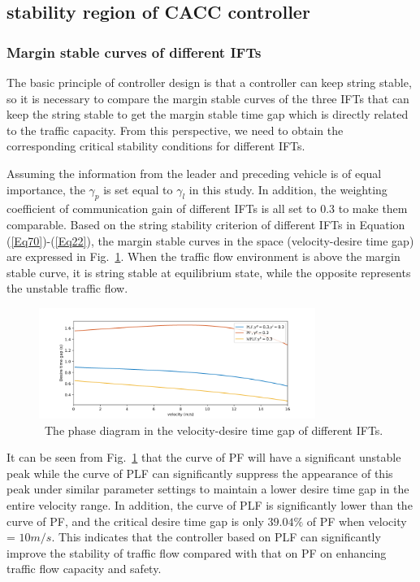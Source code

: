 \documentclass[journal]{IEEEtran}
\begin{document}
\subsection{stability region of CACC controller}
\subsubsection{Margin stable curves of different IFTs}
\label{Section 5.1.1}
The basic principle of controller design is that a controller can keep string stable, so it is necessary to compare the margin stable curves of the three IFTs that can keep the string stable to get the margin stable time gap which is directly related to the traffic capacity. From this perspective, we need to obtain the corresponding critical stability conditions for different IFTs.


Assuming the information from the leader and preceding vehicle is of equal importance, the $\gamma_p$ is set equal to $\gamma_l$ in this study. In addition, the weighting coefficient of communication gain of different IFTs is all set to 0.3 to make them comparable. Based on the string stability criterion of different IFTs in Equation (\ref{Eq70})-(\ref{Eq22}), the margin stable curves in the space (velocity-desire time gap) are expressed in Fig.~\ref{Figure3}. When the traffic flow environment is above the margin stable curve, it is string stable at equilibrium state, while the opposite represents the unstable traffic flow.

\begin{figure}
\centering
\includegraphics[width=9cm]{fig3.png}
\caption{~The phase diagram in the velocity-desire time gap of different IFTs.} 
\label{Figure3}
\end{figure}

It can be seen from Fig.~\ref{Figure3} that the curve of PF will have a significant unstable peak while the curve of PLF can significantly suppress the appearance of this peak under similar parameter settings to maintain a lower desire time gap in the entire velocity range. In addition, the curve of PLF is significantly lower than the curve of PF, and the critical desire time gap is only $39.04\%$ of PF when velocity = $10m/s$. This indicates that the controller based on PLF can significantly improve the stability of traffic flow compared with that on PF on enhancing traffic flow capacity and safety.
\end{document}
